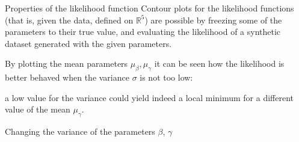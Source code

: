 \documentclass{beamer}
\begin{document}
\begin{frame}{Properties of the likelihood function}
  Contour plots for the likelihood functions (that is, given the data, defined on \(\mathbb{R}^5\)) are possible by freezing some of the parameters to their true value,
  and evaluating the likelihood of a synthetic dataset generated with the given parameters.

  By plotting the mean parameters \(\mu_\beta, \mu_\gamma\) it can be seen how the likelihood is better behaved when the variance \(\sigma\) is not too low:

  a low value for the variance could yield indeed a local minimum for a different value of the mean \(\mu_\gamma\).
  
\end{frame}

\begin{frame}{Changing the variance of the parameters \(\beta\), \(\gamma\)}

  \begin{center}
  \end{center}


\end{frame}
\end{document}
